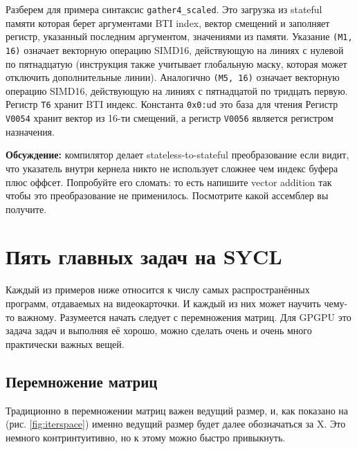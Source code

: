 \documentclass[a4paper,12pt,oneside]{article}
\begin{document}
Разберем для примера синтаксис \lstinline!gather4_scaled!. Это загрузка из stateful памяти которая берет аргументами BTI index, вектор смещений и заполняет регистр, указанный последним аргументом, значениями из памяти.
Указание \lstinline!(M1, 16)! означает векторную операцию SIMD16, действующую на линиях с нулевой по пятнадцатую (инструкция также учитывает глобальную маску, которая может отключить дополнительные линии).
Аналогично \lstinline!(M5, 16)! означает векторную операцию SIMD16, действующую на линиях с пятнадцатой по тридцать первую.
Регистр \lstinline!T6! хранит BTI индекс.
Константа \lstinline!0x0:ud! это база для чтения
Регистр \lstinline!V0054! хранит вектор из 16-ти смещений, а регистр \lstinline!V0056! является регистром назначения.

\textbf{Обсуждение:} компилятор делает stateless-to-stateful преобразование если видит, что указатель внутри кернела никто не использует сложнее чем индекс буфера плюс оффсет. Попробуйте его сломать: то есть напишите vector addition так чтобы это преобразование не применилось. Посмотрите какой ассемблер вы получите.

\pagebreak
\section{Пять главных задач на SYCL}\label{sec:FiveTasks}

Каждый из примеров ниже относится к числу самых распространённых программ, отдаваемых на видеокарточки.
И каждый из них может научить чему-то важному.
Разумеется начать следует с перемножения матриц.
Для GPGPU это задача задач и выполняя её хорошо, можно сделать очень и очень много практически важных вещей.

\subsection{Перемножение матриц}\label{subsec:gemm}

Традиционно в перемножении матриц важен ведущий размер, и, как показано на (рис. \ref{fig:iterspace}) именно ведущий размер будет далее обозначаться за X.
Это немного контринтуитивно, но к этому можно быстро привыкнуть.
\end{document}
